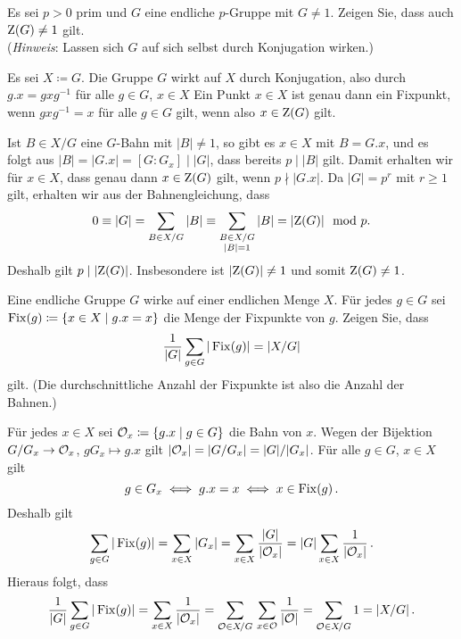 \begin{question}[subtitle = Mehr Bahnenkombinatorik]
  Es sei $p > 0$ prim und $G$ eine endliche $p$-Gruppe mit $G \neq 1$.
  Zeigen Sie, dass auch $\operatorname{Z}(G) \neq 1$ gilt.
  \\
  (\emph{Hinweis}:
   Lassen sich $G$ auf sich selbst durch Konjugation wirken.)
\end{question}


\begin{solution}
  Es sei $X \coloneqq G$.
  Die Gruppe $G$ wirkt auf $X$ durch Konjugation, also durch $g.x = g x g^{-1}$ für alle $g \in G$, $x \in X$
  Ein Punkt $x \in X$ ist genau dann ein Fixpunkt, wenn $g x g^{-1} = x$ für alle $g \in G$ gilt, wenn also $x \in \operatorname{Z}(G)$ gilt.
  
  Ist $B \in X/G$ eine $G$-Bahn mit $|B| \neq 1$, so gibt es $x \in X$ mit $B = G.x$, und es folgt aus $|B| = |G.x| = [G : G_x] \mid |G|$, dass bereits $p \mid |B|$ gilt.
  Damit erhalten wir für $x \in X$, dass genau dann $x \in \operatorname{Z}(G)$ gilt, wenn $p \nmid |G.x|$.
  Da $|G| = p^r$ mit $r \geq 1$ gilt, erhalten wir aus der Bahnengleichung, dass
  \[
            0
    \equiv  |G|
    =       \sum_{B \in X/G} |B|
    \equiv  \sum_{\substack{B \in X/G \\ |B| = 1}} |B|
    =       |{\operatorname{Z}(G)}|
    \mod    p.
  \]
  Deshalb gilt $p \mid |{\operatorname{Z}(G)}|$.
  Insbesondere ist $|{\operatorname{Z}(G)}| \neq 1$ und somit $\operatorname{Z}(G) \neq 1$.
\end{solution}


\begin{question}
  Eine endliche Gruppe $G$ wirke auf einer endlichen Menge $X$.
  Für jedes $g \in G$ sei $\operatorname{Fix}(g) \coloneqq \{x \in X \mid g.x = x\}$ die Menge der Fixpunkte von $g$.
  Zeigen Sie, dass
  \[
      \frac{1}{|G|} \sum_{g \in G} |\operatorname{Fix}(g)|
    = |X/G|
  \]
  gilt.
  (Die durchschnittliche Anzahl der Fixpunkte ist also die Anzahl der Bahnen.)
\end{question}


\begin{solution}
  Für jedes $x \in X$ sei $\mathcal{O}_x \coloneqq \{g.x \mid g \in G\}$ die Bahn von $x$.
  Wegen der Bijektion $G/G_x \to \mathcal{O}_x$, $g G_x \mapsto g.x$ gilt $|\mathcal{O}_x| = |G/G_x| = |G|/|G_x|$.
  Für alle $g \in G$, $x \in X$ gilt
  \[
          g \in G_x
    \iff  g.x = x
    \iff  x \in \operatorname{Fix}(g) \,.
  \]
  Deshalb gilt
  \[
      \sum_{g \in G} |\operatorname{Fix}(g)|
    = \sum_{x \in X} |G_x|
    = \sum_{x \in X} \frac{|G|}{|\mathcal{O}_x|}
    = |G| \sum_{x \in X} \frac{1}{|\mathcal{O}_x|} \,.
  \]
  Hieraus folgt, dass
  \[
      \frac{1}{|G|} \sum_{g \in G} |\operatorname{Fix}(g)|
    = \sum_{x \in X} \frac{1}{|\mathcal{O}_x|}
    = \sum_{\mathcal{O} \in X\!/G} \, \sum_{x \in \mathcal{O}} \frac{1}{|\mathcal{O}|}
    = \sum_{\mathcal{O} \in X\!/G} 1
    = |X/G| \,.
  \]

\end{solution}


